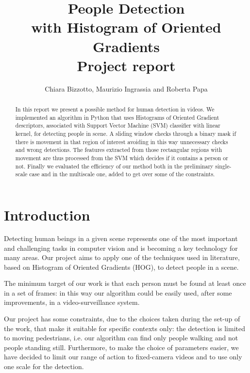 \documentclass[a4paper,letterpaper, 11pt, onecolumn]{article} %
\begin{document}
\title{People Detection \\with Histogram of Oriented Gradients \\
\large Project report}
\author{Chiara Bizzotto, Maurizio Ingrassia and Roberta Papa}

\maketitle

\begin{abstract}
In this report we present a possible method for human detection in videos. We implemented an algorithm in Python that uses Histograms of Oriented Gradient descriptors, associated with Support Vector Machine (SVM) classifier with linear kernel, for detecting people in scene. A sliding window checks through a binary mask if there is movement in that region of interest avoiding in this way unnecessary checks and wrong detections. The features extracted from those rectangular regions with movement are thus processed from the SVM which decides if it contains a person or not.
Finally we evaluated the efficiency of our method both in the preliminary single-scale case and in the multiscale one, added to get over some of the constraints.
\end{abstract}

\section{Introduction}
Detecting human beings in a given scene represents one of the most important and challenging tasks in computer vision and is becoming a key technology for many areas.
Our project aims to apply one of the techniques used in literature, based on Histogram of Oriented Gradients (HOG), to detect people in a scene. 

The minimum target of our work is that each person must be found at least once in a set of frames: in this way our algorithm could be easily used, after some improvements, in a video-surveillance system.

Our project has some constraints, due to the choices taken during the set-up of the work, that make it suitable for specific contexts only: the detection is limited to moving pedestrians, i.e. our algorithm can find only people walking and not people standing still. Furthermore, to make the choice of parameters easier, we have decided to limit our range of action to fixed-camera videos and to use only one scale for the detection.
\end{document}
